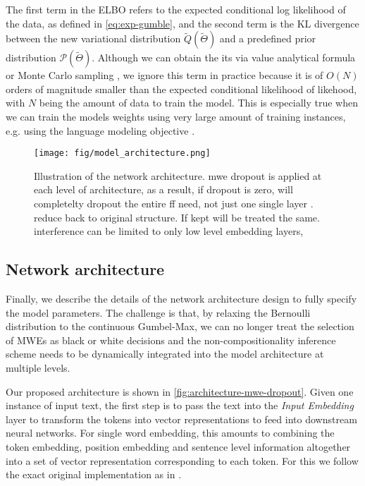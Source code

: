 The first term in the ELBO refers to the expected conditional log likelihood of the data, as defined in \autoref{eq:exp-gumble}, 
and the second term is the KL divergence between the new variational distribution $\tilde{Q} ( \tilde{\Theta})$ 
and a predefined prior distribution  $\mathcal{P}( \tilde{\Theta})$.
Although we can obtain the its via value analytical formula or Monte Carlo sampling \cite{gal2016uncertainty}, 
we ignore this term in practice because it is of $O(N)$ orders of magnitude smaller than the expected conditional likelihood of likehood, with $N$ being the amount of data to train the model. 
This is especially true when we can train the models weights using very large amount of training instances, e.g. using the language modeling objective \cite{devlin2018bert}.





\begin{figure}[htb]
    \centering
    \texttt{[image: fig/model\_architecture.png]}
    \vspace{20pt}
    \caption{Illustration of the \BertMWE network architecture. mwe dropout is applied at each level of architecture, as a result,
    if dropout is zero, will completelty dropout the entire ff need, not just one single layer
    . reduce back to original structure.  If kept will be treated the same.
    interference can be limited to only low level embedding layers, }
    \vspace{10pt}
    \label{fig:architecture-mwe-dropout}
\end{figure}



\subsection{Network architecture}
Finally, we describe the details of the network architecture design to fully specify the model parameters. 
The challenge is that, by relaxing the Bernoulli distribution to the continuous Gumbel-Max, we can no longer 
treat the selection of MWEs as black or white decisions
and the non-compositionality inference scheme needs to 
be dynamically integrated into the model architecture at multiple levels. 

Our proposed architecture is shown in \autoref{fig:architecture-mwe-dropout}. 
Given one instance of input text, the first step is to pass the text into the \textit{Input Embedding} layer to transform the tokens into vector representations to feed into downstream neural networks.
For single word embedding, this amounts to combining the token embedding, position embedding and sentence level information altogether into 
a set of vector representation
corresponding to each token. For this we follow the exact original implementation as in \cite{devlin2018bert}.

